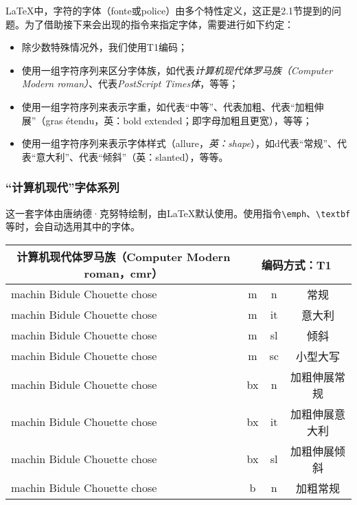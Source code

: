 \LaTeX 中，字符的字体（fonte或police）由多个特性定义，这正是2.1节提到的问题。为了借助接下来会出现的指令来指定字体，需要进行如下约定：

\begin{itemize}
    \item 除少数特殊情况外，我们使用T1编码；
    \item 使用一组字符序列来区分字体族，如代表\emph{计算机现代体罗马族（Computer Modern roman）}、代表\emph{PostScript Times体}，等等；
    \item 使用一组字符序列来表示字重，如代表“中等”、代表加粗、代表“加粗伸展”（gras étendu，英：bold extended；即字母加粗且更宽），等等；
    \item 使用一组字符序列来表示字体样式（allure，\emph{英：shape}），如d代表“常规”、代表“意大利”、代表“倾斜”（英：slanted），等等。
\end{itemize}

\subsubsection{“计算机现代”字体系列}

这一套字体由唐纳德·克努特绘制，由\LaTeX 默认使用。使用指令\verb|\emph|、\verb|\textbf|等时，会自动选用其中的字体。

\newlength{\extrarowheight}

\newenvironment{decritfonte}[3][T1]{%
  \begin{center}
    \setlength{\extrarowheight}{2pt}
    \begin{tabular}{|l|c|c|c|}\hline%
      \multicolumn{1}{|c|}{#2#3）}&
      \multicolumn{3}{c|}{编码方式：#1}\\
      \hline
    }%
    {\hline%
    \end{tabular}
  \end{center}
}

\newcommand{\testefonte}[4]{%
    \fontencoding{#1}%
    \fontfamily{#2}%
    \fontseries{#3}%
    \fontshape{#4}%
    \selectfont}

\newcommand{\phrasetest}{machin Bidule Chouette chose}

\newcommand{\descriptionfonte}[5][T1]{%
  {\testefonte{#1}{#2}{#3}{#4}\phrasetest}&#3&#4&#5\\
  \hline}

  \begin{decritfonte}{计算机现代体罗马族（Computer Modern roman，}{cmr}
    \descriptionfonte{cmr}{m}{n}{常规}
    \descriptionfonte{cmr}{m}{it}{意大利}
    \descriptionfonte{cmr}{m}{sl}{倾斜}
    \descriptionfonte{cmr}{m}{sc}{小型大写}
    \descriptionfonte{cmr}{bx}{n}{加粗伸展常规}
    \descriptionfonte{cmr}{bx}{it}{加粗伸展意大利}
    \descriptionfonte{cmr}{bx}{sl}{加粗伸展倾斜}
    \descriptionfonte{cmr}{b}{n}{加粗常规}
  \end{decritfonte}
  
